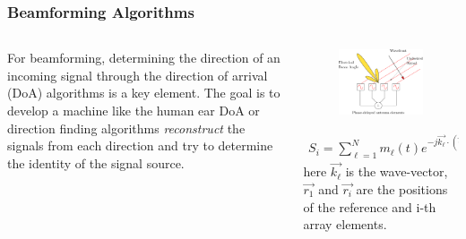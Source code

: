 \documentclass[10pt]{beamer}
\begin{document}
\begin{frame}
    \frametitle{Beamforming Algorithms}


    

    \begin{columns}[T]
        \begin{column}{.5\textwidth}
            \begin{outline}
                \1 For beamforming, determining the direction of an incoming signal through the direction of arrival (DoA) algorithms is a key element.
                \1 The goal is to develop a machine like the human ear
                \1 DoA or direction finding algorithms \textit{reconstruct} the signals from each direction and try to determine the identity of the signal source.    
                \end{outline}
        \end{column}
        \begin{column}{.5\textwidth}
            \begin{figure}[T!]
                \centering
                \includegraphics[width=.85\textwidth]{antenna_array_beamforming.pdf}
                \label{fig:beamforming}
            \end{figure}
            \begin{align*}
                S_{i}=\sum_{\ell=1}^{N} m_{\ell}(t) e^{-j \overrightarrow{k_{\ell}} \cdot\left(\overrightarrow{r_{i}}-\overrightarrow{r_{1}}\right)}
            \end{align*}
            \small here $\overrightarrow{k_{\ell}}$ is the wave-vector, $\overrightarrow{r_{1}}$ and $\overrightarrow{r_{i}}$ are the positions of the reference and i-th array elements.
        \end{column}
    \end{columns}
\end{frame}
\end{document}
